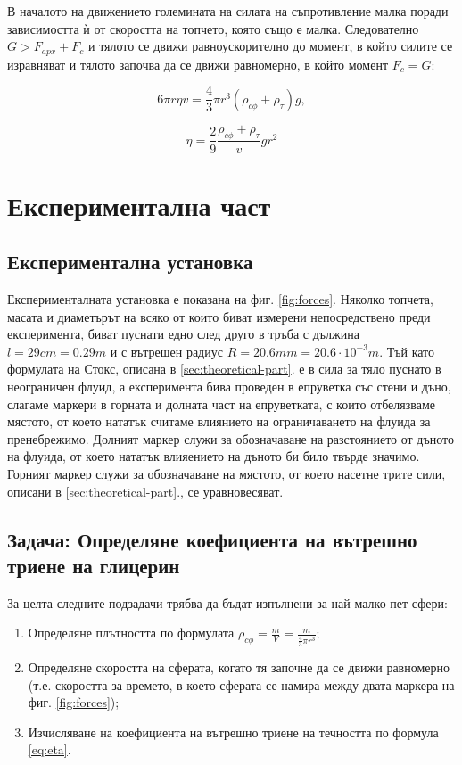 \documentclass[12pt]{article}
\begin{document}
В началото на движението големината на силата на съпротивление малка поради зависимостта ѝ от скоростта на топчето, която също е малка. Следователно $G > F_{apx} + F_c$ и тялото се движи равноускорително до момент, в който силите се изравняват и тялото започва да се движи равномерно, в който момент $F_c = G$:

\begin{displaymath}
    6\pi r \eta v = \frac{4}{3} \pi r^3 (\rho_{c\phi} + \rho_{\tau})g,
\end{displaymath}

\begin{equation}\label{eq:eta}
    \eta = \frac{2}{9} \frac{\rho_{c\phi} + \rho_{\tau}}{v}gr^2
\end{equation}



\section{Експериментална част}
\subsection{Експериментална установка}\label{sec:experimental-setup}
Експерименталната установка е показана на фиг. \ref{fig:forces}. Няколко топчета, масата и диаметърът на всяко от които биват измерени непосредствено преди експеримента, биват пуснати едно след друго в тръба с дължина $l= 29cm = 0.29 m$ и с вътрешен радиус $R = 20.6 mm = 20.6 \cdot 10^{-3} m$. Тъй като формулата на Стокс, описана в \ref{sec:theoretical-part}. е в сила за тяло пуснато в неограничен флуид, а експеримента бива проведен в епруветка със стени и дъно, слагаме маркери в горната и долната част на епруветката, с които отбелязваме мястото, от което нататък считаме влиянието на ограничаването на флуида за пренебрежимо. Долният маркер служи за обозначаване на разстоянието от дъното на флуида, от което нататък влияението на дъното би било твърде значимо. Горният маркер служи за обозначаване на мястото, от което насетне трите сили, описани в \ref{sec:theoretical-part}., се уравновесяват.  

\subsection{Задача: Определяне коефициента на вътрешно триене на глицерин}
За целта следните подзадачи трябва да бъдат изпълнени за най-малко пет сфери:
\begin{enumerate}
    \item Определяне плътността по формулата $\rho_{c\phi} = \frac{m}{V} = \frac{m}{\frac{4}{3}\pi r^3}$;
    \item Определяне скоростта на сферата, когато тя започне да се движи равномерно (т.е. скоростта за времето, в което сферата се намира между двата маркера на фиг. \ref{fig:forces});
    \item Изчисляване на коефициента на вътрешно триене на течността по формула \ref{eq:eta}.
\end{enumerate}
\end{document}
